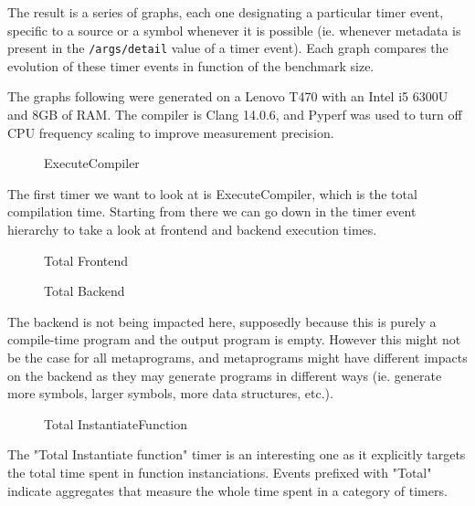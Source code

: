 \documentclass[../main]{subfiles}
\begin{document}
The result is a series of graphs, each one designating a particular timer event,
specific to a source or a symbol whenever it is possible (ie. whenever metadata
is present in the \lstinline{/args/detail} value of a timer event). Each graph
compares the evolution of these timer events in function of the benchmark size.

The graphs following were generated on a Lenovo T470 with an Intel i5 6300U and
8GB of RAM. The compiler is Clang 14.0.6, and Pyperf \cite{pyperf} was used
to turn off CPU frequency scaling to improve measurement precision.

\begin{figure}[h]
\fontsize{8}{10}\selectfont

\caption{ExecuteCompiler}
\end{figure}

The first timer we want to look at is ExecuteCompiler, which is the total
compilation time. Starting from there we can go down in the timer event
hierarchy to take a look at frontend and backend execution times.

\begin{figure}[h]
\fontsize{8}{10}\selectfont

\caption{Total Frontend}
\end{figure}

\begin{figure}[h]
\fontsize{8}{10}\selectfont

\caption{Total Backend}
\end{figure}

The backend is not being impacted here, supposedly because this is purely a
compile-time program and the output program is empty. However this might not be
the case for all metaprograms, and metaprograms might have different impacts on
the backend as they may generate programs in different ways (ie. generate more
symbols, larger symbols, more data structures, etc.).

\begin{figure}[h]
\fontsize{8}{10}\selectfont

\caption{Total InstantiateFunction}
\end{figure}

The "Total Instantiate function" timer is an interesting one as it explicitly
targets the total time spent in function instanciations.
Events prefixed with "Total" indicate aggregates that measure
the whole time spent in a category of timers.
\end{document}
